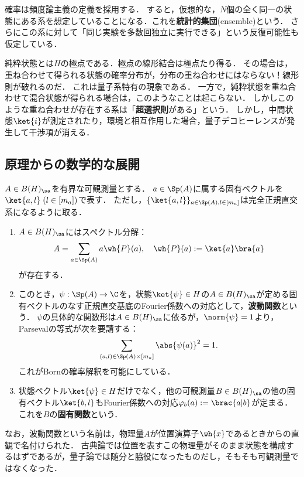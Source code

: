 \documentclass[uplatex,dvipdfmx]{jsreport}
\begin{document}
\begin{remark}[Bornの確率解釈について]
    確率は頻度論主義の定義を採用する．
    すると，仮想的な，$N$個の全く同一の状態にある系を想定していることになる．これを\textbf{統計的集団}(ensemble)という．
    さらにこの系に対して「同じ実験を多数回独立に実行できる」という反復可能性も仮定している．
\end{remark}

\begin{remark}[量子干渉]
    純粋状態とは$H$の極点である．極点の線形結合は極点たり得る．
    その場合は，重ね合わせて得られる状態の確率分布が，分布の重ね合わせにはならない！線形則が破れるのだ．
    これは量子系特有の現象である．
    一方で，純粋状態を重ね合わせて混合状態が得られる場合は，このようなことは起こらない．
    しかしこのような重ね合わせが存在する系は「\textbf{超選択則}がある」という．
    しかし，中間状態$\ket{i}$が測定されたり，環境と相互作用した場合，量子デコヒーレンスが発生して干渉項が消える．
\end{remark}

\subsection{原理からの数学的な展開}

\begin{remarks}[可観測量]
    $A\in B(H)_\sa$を有界な可観測量とする．
    $a\in\Sp(A)$に属する固有ベクトルを$\ket{a,l}\;(l\in[m_a])$で表す．
    ただし，$\{\ket{a,l}\}_{a\in\Sp(A),l\in[m_a]}$は完全正規直交系になるように取る．
    \begin{enumerate}
        \item $A\in B(H)_\sa$にはスペクトル分解：
        \[A=\sum_{a\in\Sp(A)}a\wh{P}(a),\quad \wh{P}(a):=\ket{a}\bra{a}\]
        が存在する．
        \item このとき，$\psi:\Sp(A)\to\C$を，状態$\ket{\psi}\in H$の$A\in B(H)_\sa$が定める固有ベクトルのなす正規直交基底のFourier係数への対応として，\textbf{波動関数}という．
        $\psi$の具体的な関数形は$A\in B(H)_\sa$に依るが，$\norm{\psi}=1$より，Parsevalの等式が次を要請する：
        \[\sum_{(a,l)\in\Sp(A)\times[m_a]}\abs{\psi(a)}^2=1.\]
        これがBornの確率解釈を可能にしている．
        \item 状態ベクトル$\ket{\psi}\in H$だけでなく，他の可観測量$B\in B(H)_\sa$の他の固有ベクトル$\ket{b,l}$もFourier係数への対応$\varphi_b(a):=\brac{a|b}$が定まる．これを$B$の\textbf{固有関数}という．
    \end{enumerate}
    なお，波動関数という名前は，物理量$A$が位置演算子$\wh{x}$であるときからの直観で名付けられた．
    古典論では位置を表すこの物理量がそのまま状態を構成するはずであるが，量子論では随分と脇役になったものだし，そもそも可観測量ではなくなった．
\end{remarks}
\end{document}
